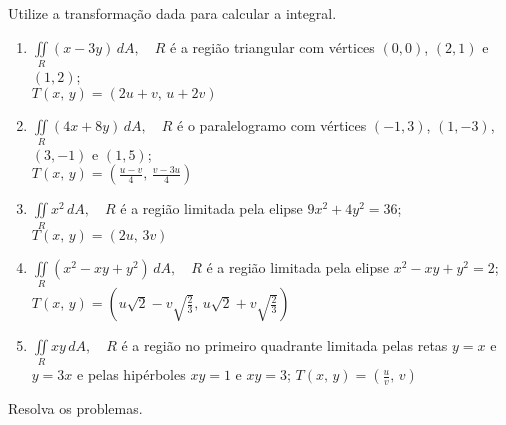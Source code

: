 \documentclass[a4paper, 12pt]{article}
\begin{document}
	
	
	\vspace{5mm}
	
	Utilize a transformação dada para calcular a integral.
	
	\begin{enumerate}
		
		\item $\displaystyle \iint \limits_R (x - 3y) \, dA, \quad R$ é a região triangular com vértices $(0,0)$, $(2,1)$ e $(1,2)$; \\ $T(x,\, y) = (2u + v,\, u + 2v)$
		
		\item $\displaystyle \iint \limits_R (4x + 8y) \, dA, \quad R$ é o paralelogramo com vértices $(-1,3)$, $(1,-3)$, $(3,-1)$ e $(1,5)$; \\ $T(x,\, y) = (\frac{u-v}{4},\, \frac{v-3u}{4})$
		
		\item $\displaystyle \iint \limits_R x^2 \, dA, \quad R$ é a região limitada pela elipse $9x^2 + 4y^2 = 36$; \\ $T(x,\, y) = (2u,\, 3v)$
		\resposta{$6\pi$}
		
		\item $\displaystyle \iint \limits_R (x^2 - xy + y^2) \, dA, \quad R$ é a região limitada pela elipse $x^2 - xy + y^2 = 2$; \\ $T(x,\, y) = (u\sqrt{2} - v\sqrt{\frac{2}{3}},\, u\sqrt{2} + v\sqrt{\frac{2}{3}})$
		
		\item $\displaystyle \iint \limits_R xy \, dA, \quad R$ é a região no primeiro quadrante limitada pelas retas $y = x$ e $y = 3x$ e pelas hipérboles $xy = 1$ e $xy = 3$; \quad $T(x,\, y) = (\frac{u}{v},\, v)$
	
	\end{enumerate}
	
	\vspace{5mm}
	
	Resolva os problemas.
	
\end{document}
